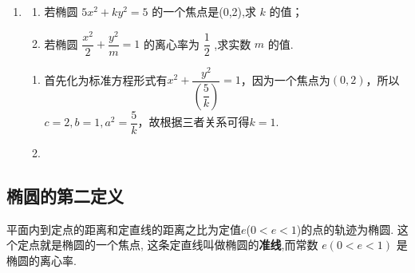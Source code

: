 \begin{enumerate}
\begin{jieda}
\begin{enumerate}
            \item 由题意,得 ${2a} = {10}$ ,即 $a = 5$ . 又 $e = \dfrac{c}{a} = \dfrac{3}{5}$ ,所以 $c = 3$ . 因此${b}^{2} = {a}^{2} - {c}^{2} = {25} - 9 = {16}.$
            \item 根据几何关系可知$b = c = 3$，故$a = 3\sqrt{2}$，因此标准方程为$\dfrac{x^2}{18} + \dfrac{y^2}{9} = 1$
        \end{enumerate}
    \end{jieda}
    \item \begin{enumerate}
        \item 若椭圆 $5{x}^{2} + k{y}^{2} = 5$ 的一个焦点是(0,2),求 $k$ 的值；
        \item 若椭圆 $\dfrac{{x}^{2}}{2} + \dfrac{{y}^{2}}{m} = 1$ 的离心率为 $\dfrac{1}{2}$ ,求实数 $m$ 的值.
    \end{enumerate}
    \begin{jieda}
        \begin{enumerate}
            \item 首先化为标准方程形式有$x^2 + \dfrac{y^2}{\left(\dfrac{5}{k}\right)} = 1$，因为一个焦点为$(0, 2)$，所以$c = 2, b = 1, a^2 = \dfrac{5}{k}$，故根据三者关系可得$k = 1$.
            \item 
        \end{enumerate}
    \end{jieda}
    
\end{enumerate}
\subsection*{椭圆的第二定义}
平面内到定点的距离和定直线的距离之比为定值$e$($0 < e < 1$)的点的轨迹为椭圆. 这个定点就是椭圆的一个焦点, 这条定直线叫做椭圆的\textbf{准线},而常数 $e\left( {0 < e < 1}\right)$ 是椭圆的离心率.
        

